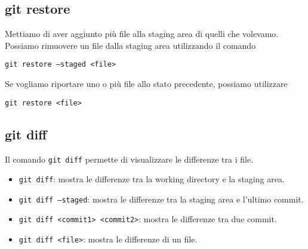 \documentclass{article}
\begin{document}
\subsection{git restore}
Mettiamo di aver aggiunto più file alla staging area di quelli che volevamo.
Possiamo rimuovere un file dalla staging area utilizzando il comando
\begin{highlight}
    \texttt{git restore --staged <file>}
\end{highlight}
Se vogliamo riportare uno o più file allo stato precedente, possiamo utilizzare
\begin{highlight}
    \texttt{git restore <file>}
\end{highlight}


\subsection{git diff}
Il comando \texttt{git diff} permette di visualizzare le differenze tra i file.
\begin{itemize}
    \item \texttt{git diff}: mostra le differenze tra la working directory e la staging area.
    \item \texttt{git diff --staged}: mostra le differenze tra la staging area e l'ultimo commit.
    \item \texttt{git diff <commit1> <commit2>}: mostra le differenze tra due commit.
    \item \texttt{git diff <file>}: mostra le differenze di un file.
\end{itemize}
\end{document}

